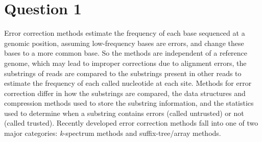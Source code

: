 \section{Question 1}

Error correction methods estimate the frequency of each base sequenced at a genomic position, assuming low-frequency bases are errors, and change these bases to a more common base.
So the methods are independent of a reference genome, which may lead to improper corrections due to alignment errors, the substrings of reads are compared to the substrings present in other reads to estimate the frequency of each called nucleotide at each site.
Methods for error correction differ in how the substrings are compared, the data structures and compression methods used to store the substring information, and the statistics used to determine when a substring contains errors (called untrusted) or not (called trusted).
Recently developed error correction methods fall into one of two major categories: \textit{k}-spectrum methods and suffix-tree/array methods.

